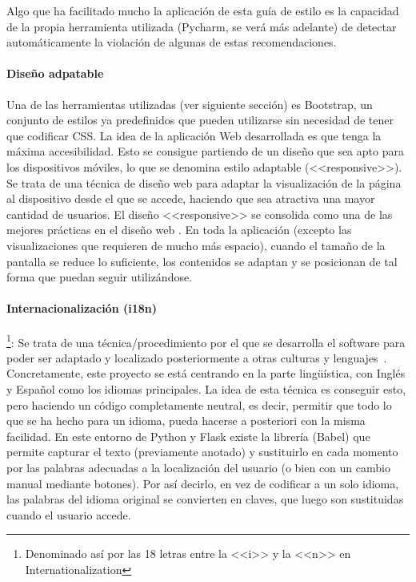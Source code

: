 Algo que ha facilitado mucho la aplicación de esta guía de estilo es la
capacidad de la propia herramienta utilizada (Pycharm, se verá más adelante) de
detectar automáticamente la violación de algunas de estas recomendaciones.

\paragraph{Diseño adpatable} Una de las herramientas utilizadas (ver siguiente
sección) es Bootstrap, un conjunto de estilos ya predefinidos que pueden
utilizarse sin necesidad de tener que codificar CSS. La idea de la aplicación
Web desarrollada es que tenga la máxima accesibilidad. Esto se consigue
partiendo de un diseño que sea apto para los dispositivos móviles, lo que se
denomina estilo adaptable (<<responsive>>). Se trata de una técnica de diseño
web para adaptar la visualización de la página al dispositivo desde el que se
accede, haciendo que sea atractiva una mayor cantidad de usuarios. El diseño
<<responsive>> se consolida como una de las mejores prácticas en el diseño web
\cite{40defiebre}. En toda la aplicación (excepto las visualizaciones que
requieren de mucho más espacio), cuando el tamaño de la pantalla se reduce lo
suficiente, los contenidos se adaptan y se posicionan de tal forma que puedan
seguir utilizándose.

\paragraph{Internacionalización (i18n)}\footnote{Denominado así por las 18 letras
entre la <<i>> y la <<n>> en Internationalization}: Se trata de una
técnica/procedimiento por el que se desarrolla el software para poder ser
adaptado y localizado posteriormente a otras culturas y
lenguajes~\cite{lokalise}. Concretamente, este proyecto se está centrando en la
parte lingüística, con Inglés y Español como los idiomas principales. La idea de
esta técnica es conseguir esto, pero haciendo un código completamente neutral,
es decir, permitir que todo lo que se ha hecho para un idioma, pueda hacerse a
posteriori con la misma facilidad. En este entorno de Python y Flask existe la
librería (Babel) que permite capturar el texto (previamente anotado) y
sustituirlo en cada momento por las palabras adecuadas a la localización del
usuario (o bien con un cambio manual mediante botones). Por así decirlo, en vez
de codificar a un solo idioma, las palabras del idioma original se convierten en
claves, que luego son sustituidas cuando el usuario accede.


